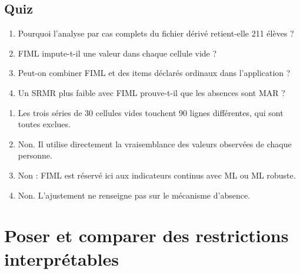 \documentclass[
  french,
  11pt,
  a4paper,
  DIV=11,
  numbers=noendperiod]{scrreprt}
\providecommand{\tightlist}{%
  \setlength{\itemsep}{0pt}\setlength{\parskip}{0pt}}
\begin{document}
\section{Quiz}\label{quiz-8}

\begin{enumerate}
\def\labelenumi{\arabic{enumi}.}
\tightlist
\item
  Pourquoi l'analyse par cas complets du fichier dérivé retient-elle 211
  élèves ?
\item
  FIML impute-t-il une valeur dans chaque cellule vide ?
\item
  Peut-on combiner FIML et des items déclarés ordinaux dans
  l'application ?
\item
  Un SRMR plus faible avec FIML prouve-t-il que les absences sont MAR ?
\end{enumerate}

\begin{tcolorbox}[enhanced jigsaw, arc=.35mm, bottomrule=.15mm, bottomtitle=1mm, breakable, colback=white, colbacktitle=quarto-callout-tip-color!10!white, colframe=quarto-callout-tip-color-frame, coltitle=black, left=2mm, leftrule=.75mm, opacityback=0, opacitybacktitle=0.6, rightrule=.15mm, title={Réponses}, titlerule=0mm, toprule=.15mm, toptitle=1mm]

\begin{enumerate}
\def\labelenumi{\arabic{enumi}.}
\tightlist
\item
  Les trois séries de 30 cellules vides touchent 90 lignes différentes,
  qui sont toutes exclues.
\item
  Non. Il utilise directement la vraisemblance des valeurs observées de
  chaque personne.
\item
  Non : FIML est réservé ici aux indicateurs continus avec ML ou ML
  robuste.
\item
  Non. L'ajustement ne renseigne pas sur le mécanisme d'absence.
\end{enumerate}

\end{tcolorbox}


\chapter{Poser et comparer des restrictions
interprétables}\label{sec-contraintes}
\end{document}
